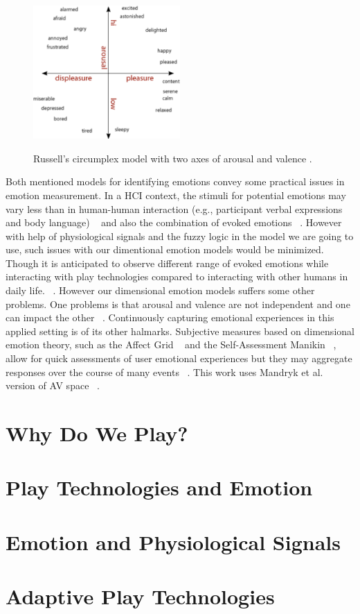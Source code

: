 \begin{figure}[h!]
  \caption[Russell's arousal and valence model]
  {Russell's circumplex model with two axes of arousal and valence \footnotemark.}
  \centering
  \includegraphics[width=0.5\textwidth]{images/russell-av-space.pdf}
  \label{fig:russelavspace}
\end{figure}


Both mentioned models for identifying emotions convey some
practical issues in emotion measurement. In a HCI context, the 
stimuli for potential emotions may vary less than
in human-human interaction (e.g., participant verbal expressions and body language) 
~\cite{zhang2010service} and also the combination of
evoked emotions ~\cite{peter2006emotion}. However with help of physiological
signals and the fuzzy logic in the model we are going to
use, such issues with our dimentional emotion models would
be minimized. Though it is anticipated to observe different range 
of evoked emotions while interacting with play
technologies compared to interacting with other humans in
daily life. ~\cite{zhang2010service}. However our dimensional emotion models
suffers some other problems. One problems is that arousal
and valence are not independent and one can impact the
other ~\cite{mandryk2007fuzzy}. Continuously capturing emotional experiences
in this applied setting is of its other halmarks. Subjective
measures based on dimensional emotion theory, such as the
Affect Grid ~\cite{russell1989affect} and the Self-Assessment 
Manikin ~\cite{bradley1994measuring}, allow
for quick assessments of user emotional experiences but they
may aggregate responses over the course of many events ~\cite{zhang2010service}.
This work uses Mandryk et al. version of AV space ~\cite{mandryk2007fuzzy}.


\section{Why Do We Play?}

\section{Play Technologies and Emotion}

\section{Emotion and Physiological Signals}

\section{Adaptive Play Technologies}
